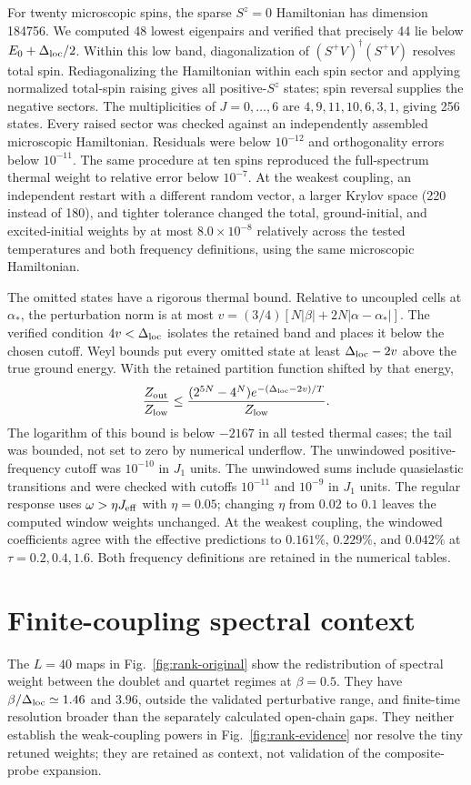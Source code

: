For twenty microscopic spins, the sparse $S^z=0$ Hamiltonian has dimension
184756. We computed 48 lowest eigenpairs and verified that precisely 44
lie below $E_0+\Delta_{\mathrm{loc}}/2$. Within this low band, diagonalization of
$(S^+V)^\dagger(S^+V)$ resolves total spin. Rediagonalizing the Hamiltonian
within each spin sector and applying normalized total-spin raising gives
all positive-$S^z$ states; spin reversal supplies the negative sectors.
The multiplicities of $J=0,\ldots,6$ are $4,9,11,10,6,3,1$,
giving 256 states. Every raised sector was checked against an independently
assembled microscopic Hamiltonian. Residuals were below $10^{-12}$ and
orthogonality errors below $10^{-11}$. The same procedure at ten spins
reproduced the full-spectrum thermal weight to relative error below
$10^{-7}$.
At the weakest coupling, an independent restart with a different random
vector, a larger Krylov space (220 instead of 180), and tighter tolerance
changed the total, ground-initial, and excited-initial weights by at most
$8.0\times10^{-8}$ relatively across the tested temperatures and both
frequency definitions, using the same microscopic Hamiltonian.

The omitted states have a rigorous thermal bound. Relative to uncoupled
cells at $\alpha_*$, the perturbation norm is at most
$v=(3/4)[N|\beta|+2N|\alpha-\alpha_*|]$.
The verified condition $4v<\Delta_{\mathrm{loc}}$ isolates the retained band and places
it below the chosen cutoff. Weyl bounds put every omitted state at least
$\Delta_{\mathrm{loc}}-2v$ above the true ground energy. With the retained partition
function shifted by that energy,
\begin{equation}
 \frac{Z_{\rm out}}{Z_{\rm low}}
 \le \frac{(2^{5N}-4^N)e^{-(\Delta_{\mathrm{loc}}-2v)/T}}{Z_{\rm low}}.
\end{equation}
The logarithm of this bound is below $-2167$ in all tested thermal cases;
the tail was bounded, not set to zero by numerical underflow.
The unwindowed positive-frequency cutoff was $10^{-10}$ in $J_1$ units.
The unwindowed sums include quasielastic transitions and were checked
with cutoffs $10^{-11}$ and $10^{-9}$ in $J_1$ units.
The regular response uses $\omega>\eta J_{\rm eff}$ with $\eta=0.05$;
changing $\eta$ from $0.02$ to $0.1$ leaves the computed window weights
unchanged. At the weakest coupling, the windowed coefficients agree
with the effective predictions to $0.161\%$, $0.229\%$, and $0.042\%$
at $\tau=0.2,0.4,1.6$. Both frequency definitions are retained in the
numerical tables.

\section{Finite-coupling spectral context}

The $L=40$ maps in Fig.~\ref{fig:rank-original} show the redistribution
of spectral weight between the doublet and quartet regimes at
$\beta=0.5$. They have
$\beta/\Delta_{\mathrm{loc}}\simeq1.46$ and $3.96$, outside the validated perturbative
range, and finite-time resolution broader than the separately calculated
open-chain gaps. They neither establish the weak-coupling powers in
Fig.~\ref{fig:rank-evidence} nor resolve the tiny retuned weights; they
are retained as context, not validation of the composite-probe expansion.

